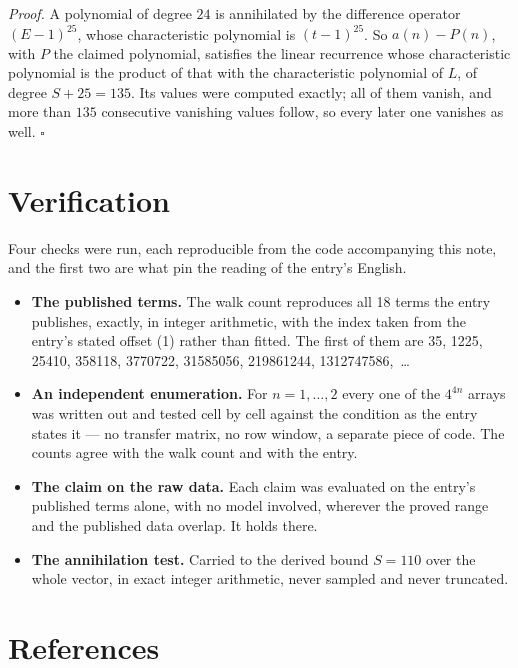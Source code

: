 \documentclass[11pt]{article}
\theoremstyle{definition}
\begin{document}
{\itshape Proof.} A polynomial of degree $24$ is annihilated by the difference operator $(E-1)^{25}$, whose characteristic polynomial is $(t-1)^{25}$. So $a(n) - P(n)$, with $P$ the claimed polynomial, satisfies the linear recurrence whose characteristic polynomial is the product of that with the characteristic polynomial of $L$, of degree $S + 25 = 135$. Its values were computed exactly; all of them vanish, and more than $135$ consecutive vanishing values follow, so every later one vanishes as well. $\square$

\section{Verification}

Four checks were run, each reproducible from the code accompanying this note, and the first two are what pin the reading of the entry's English.

\begin{itemize}

\item {\bfseries The published terms.} The walk count reproduces all 18 terms the entry publishes, exactly, in integer arithmetic, with the index taken from the entry's stated offset (1) rather than fitted. The first of them are 35, 1225, 25410, 358118, 3770722, 31585056, 219861244, 1312747586,~\dots

\item {\bfseries An independent enumeration.} For $n = 1,\dots,2$ every one of the $4^{4n}$ arrays was written out and tested cell by cell against the condition as the entry states it --- no transfer matrix, no row window, a separate piece of code. The counts agree with the walk count and with the entry.

\item {\bfseries The claim on the raw data.} Each claim was evaluated on the entry's published terms alone, with no model involved, wherever the proved range and the published data overlap. It holds there.

\item {\bfseries The annihilation test.} Carried to the derived bound $S = 110$ over the whole vector, in exact integer arithmetic, never sampled and never truncated.

\end{itemize}

\section{References}
\end{document}
